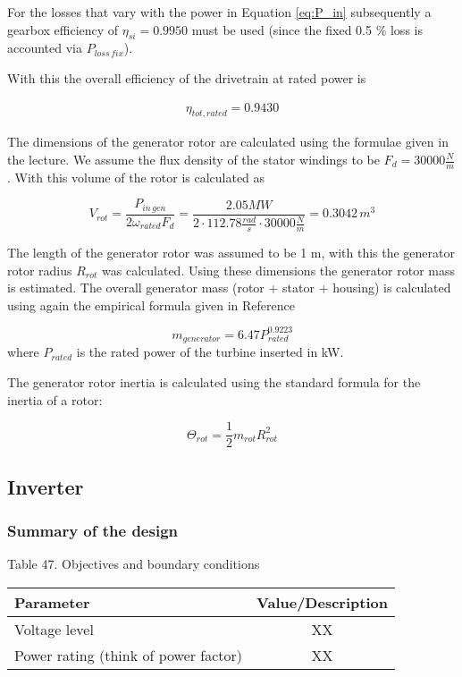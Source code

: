 For the losses that vary with the power in Equation \ref{eq:P_in} subsequently a gearbox efficiency of $\eta_{si} = 0.9950$ must be used (since the fixed 0.5 \% loss is accounted via $P_{loss \, fix}$).

With this the overall efficiency of the drivetrain at rated power is

\begin{align}
\eta_{tot, rated} = 0.9430    
\end{align}

The dimensions of the generator rotor are calculated using the formulae given in the lecture. We assume the flux density of the stator windings to be $F_d = 30000 \frac{N}{m}$. With this volume of the rotor is calculated as

\begin{equation}
    V_{rot} = \dfrac{P_{in \, gen}}{2 \omega_{rated} F_d} = \dfrac{2.05 MW}{2 \cdot 112.78 \frac{rad}{s} \cdot 30000 \frac{N}{m}} = 0.3042 \,m^3
\end{equation}

The length of the generator rotor was assumed to be 1 m, with this the generator rotor radius $R_{rot}$ was calculated. Using these dimensions the generator rotor mass is estimated. The overall generator mass (rotor + stator + housing) is calculated using again the empirical formula given in Reference~\cite{Fingersh2006}

\begin{equation}
    m_{generator} = 6.47 P_{rated}^{0.9223}
\end{equation}
where $P_{rated}$ is the rated power of the turbine inserted in kW. 

The generator rotor inertia is calculated using the standard formula for the inertia of a rotor: 

\begin{equation}
\Theta_{rot}= \dfrac{1}{2}m_{rot}R_{rot}^2
\end{equation}

\newpage
\subsection{Inverter}

\subsubsection{Summary of the design}

\begin{center}
Table 47. Objectives and boundary conditions\\
\begin{tabular}{ |l|c| } 
\hline
\textbf{Parameter} & \textbf{Value/Description}  \\ 
\hline
Voltage level & XX  \\ 
\hline
Power rating (think of power factor) & XX \\
\hline
\end{tabular} \\
\end{center}

